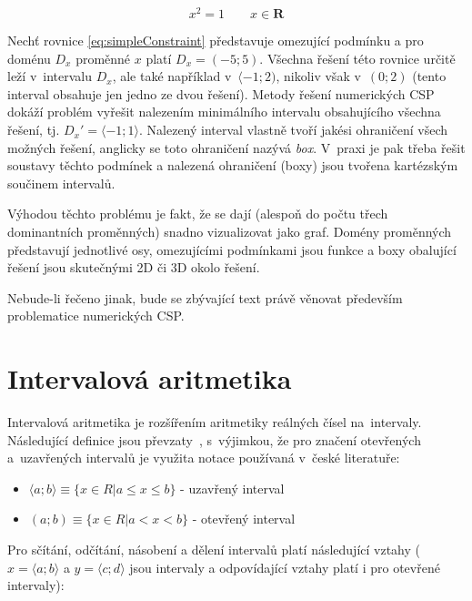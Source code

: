 \begin{equation} \label{eq:simpleConstraint}
x^2 = 1\qquad x \in \boldsymbol{R}
\end{equation}

Nechť rovnice \ref{eq:simpleConstraint} představuje omezující podmínku a pro doménu $D_x$ proměnné $x$ platí $D_x = (-5;5)$. Všechna řešení této rovnice určitě leží v~intervalu $D_x$, ale také například v~$\langle -1;2)$, nikoliv však v~$(0;2)$ (tento interval obsahuje jen jedno ze dvou řešení). Metody řešení numerických CSP dokáží problém vyřešit nalezením minimálního intervalu obsahujícího všechna řešení, tj. $D_x' = \langle -1;1\rangle$. Nalezený interval vlastně tvoří jakési ohraničení všech možných řešení, anglicky se toto ohraničení nazývá \emph{box}. V~praxi je pak třeba řešit soustavy těchto podmínek a nalezená ohraničení (boxy) jsou tvořena kartézským součinem intervalů.

Výhodou těchto problému je fakt, že se dají (alespoň do počtu třech dominantních proměnných) snadno vizualizovat jako graf. Domény proměnných představují jednotlivé osy, omezujícími podmínkami jsou funkce a boxy obalující řešení jsou skutečnými 2D či 3D  okolo řešení.

Nebude-li řečeno jinak, bude se zbývající text právě věnovat především problematice numerických CSP.



\section{Intervalová aritmetika}
\label{ch:interval_arithmetic}
Intervalová aritmetika je rozšířením aritmetiky reálných čísel na~intervaly. Následující definice jsou převzaty~\cite{Moore:09}, s~výjimkou, že pro značení otevřených a~uzavřených intervalů je využita notace používaná v~české literatuře:

\begin{itemize}
    \item $\langle a;b \rangle \equiv \{x \in R | a \le x \le b \} $ - uzavřený interval
    \item $(a;b) \equiv \{ x \in R | a < x < b \}$ - otevřený interval
\end{itemize}

Pro sčítání, odčítání, násobení a dělení intervalů platí následující vztahy ($x = \langle a; b \rangle$ a $y = \langle c; d \rangle$ jsou intervaly a odpovídající vztahy platí i pro otevřené intervaly):

